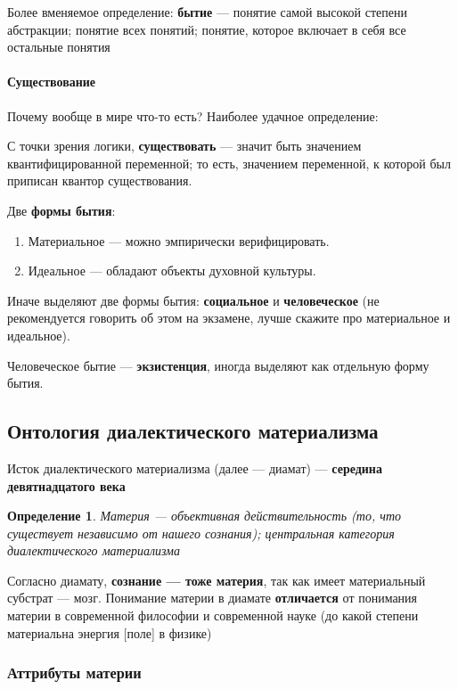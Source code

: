 \documentclass{article}
\newtheorem{definition}{Определение}
\begin{document}
\begin{flushleft}
Более вменяемое определение: \textbf{бытие} — понятие самой высокой степени абстракции; понятие всех понятий; понятие, которое включает в себя все остальные понятия

\paragraph{Существование} Почему вообще в мире что-то есть? Наиболее удачное определение:

С точки зрения логики, \textbf{существовать} — значит быть значением квантифицированной переменной; то есть, значением переменной, к которой был приписан квантор существования.

Две \textbf{формы бытия}:

\begin{enumerate}
    \item Материальное — можно эмпирически верифицировать.
    \item Идеальное — обладают объекты духовной культуры.
\end{enumerate}

Иначе выделяют две формы бытия: \textbf{социальное} и \textbf{человеческое} (не рекомендуется говорить об этом на экзамене, лучше скажите про материальное и идеальное).

Человеческое бытие — \textbf{экзистенция}, иногда выделяют как отдельную форму бытия.

\subsection{Онтология диалектического материализма}

Исток диалектического материализма (далее — диамат) — \textbf{середина девятнадцатого века}

\begin{definition}
    Материя — объективная действительность (то, что существует независимо от нашего сознания); центральная категория диалектического материализма
\end{definition}

Согласно диамату, \textbf{сознание — тоже материя}, так как имеет материальный субстрат — мозг. Понимание материи в диамате \textbf{отличается} от понимания материи в современной философии и современной науке (до какой степени материальна энергия [поле] в физике)

\subsubsection{Аттрибуты материи}


\end{flushleft}
\end{document}
